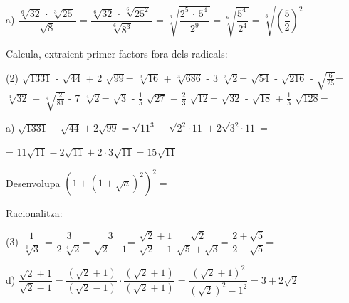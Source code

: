 \begin{mylist}
\begin{example}
	a) $\dfrac{\sqrt[{6}]{32} \, \cdot \, \sqrt[{3}]{25} \, }{\sqrt{8} } =     \dfrac{\sqrt[{6}]{32} \, \cdot \, \sqrt[{6}]{25^2} \, }{\sqrt[6]{8^3} } =
	\sqrt[6]{\dfrac{2^5 \, \cdot \, 5^4 \, }{2^9 }} = \sqrt[6]{\dfrac{  5^4 \, }{2^4 }} =\sqrt[3]{\left(\dfrac{  5 }{2 }\right)^2 }
	$ 
\end{example}

\exer[1] Calcula, extraient primer factors fora dels radicals:
\begin{tasks}(2)
	\task $\sqrt{1331} $ - $\sqrt{44} $ + 2 $\sqrt{99} $=  
	\task $\sqrt[{3}]{16} $ + $\sqrt[{3}]{686} $ - 3 $\sqrt[{3}]{2} $= 
	 $\sqrt{54} $ - $\sqrt{216} $ - $\sqrt{\frac{6}{25} } $= 
	\task $\sqrt[{4}]{32} $ + $\sqrt[{4}]{\frac{2}{81} } $ - 7 $\sqrt[{4}]{2} $=
	 $\sqrt{3} $ - $\frac{1}{5} $ $\sqrt{27} $ + $\frac{2}{3} $ $\sqrt{12} $= 
	\task $\sqrt{32} $ - $\sqrt{18} $ + $\frac{1}{5} $ $\sqrt{128} $=
\end{tasks}

   \begin{example}
	a) $\sqrt{1331} - \sqrt{44}  + 2 \sqrt{99} = \sqrt{11^3}  - \sqrt{2^2\cdot 11}  + 2 \sqrt{3^2 \cdot 11} =$ 
	
	\qquad\qquad\qquad\qquad\qquad\qquad = $11\sqrt{11}  - 2\sqrt{11}  + 2\cdot 3 \sqrt{11}= 15\sqrt{11}$ 
	\vspace{0.25cm} 
\end{example}

\exer[1] Desenvolupa $\left(1+\left(1+\sqrt{a} \right)^{2} \right)^{2} =$

\exer[1] Racionalitza:
\begin{tasks}(3)
	\task $\dfrac{1}{\sqrt[{3}]{3} } $ =     
	\task $\dfrac{3}{2\, \sqrt[{4}]{2} } $=        
	\task $\dfrac{3}{\sqrt{2} -1} $=
	\task $\dfrac{\sqrt{2} +1}{\sqrt{2} -1} $   
	\task $\dfrac{\sqrt{2} }{\sqrt{5} +\sqrt{3} } $=    
	\task $\dfrac{2+\sqrt{5} }{2-\sqrt{5} } $=
\end{tasks}

\begin{example}
	d)  $\dfrac{\sqrt{2} +1}{\sqrt{2} -1} = \dfrac{(\sqrt{2} +1)}{(\sqrt{2} -1)} \cdot \dfrac{(\sqrt{2} +1)}{(\sqrt{2} +1)} = \dfrac{(\sqrt{2} +1)^2}{(\sqrt{2})^2 -1^2}=3+2\sqrt{2}$   
\end{example}
 

\end{mylist}

